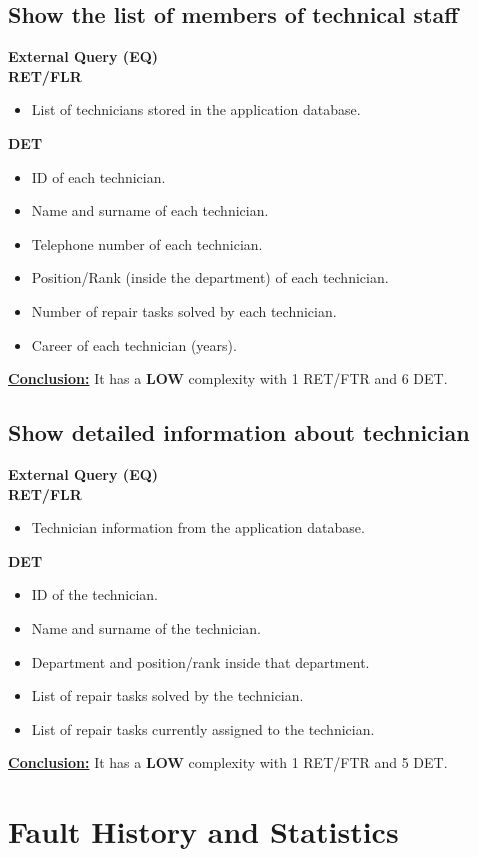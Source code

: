 \subsection{Show the list of members of technical staff}
\textbf{External Query (EQ)} \\ 
\textbf{RET/FLR}
\begin{itemize}
\item List of technicians stored in the application database.
\end{itemize}
\textbf{DET}
\begin{itemize}
\item ID of each technician.
\item Name and surname of each technician.
\item Telephone number of each technician.
\item Position/Rank (inside the department) of each technician.
\item Number of repair tasks solved by each technician.
\item Career of each technician (years). 
\end{itemize}
\textbf{\underline{Conclusion:}} It has a \textbf{LOW} complexity with 1 RET/FTR and 6 DET.

\subsection{Show detailed information about technician}
\textbf{External Query (EQ)} \\ 
\textbf{RET/FLR}
\begin{itemize}
\item Technician information from the application database.
\end{itemize}
\textbf{DET}
\begin{itemize}
\item ID of the technician.
\item Name and surname of the technician.
\item Department and position/rank inside that department.
\item List of repair tasks solved by the technician.
\item List of repair tasks currently assigned to the technician.
\end{itemize}
\textbf{\underline{Conclusion:}} It has a \textbf{LOW} complexity with 1 RET/FTR and 5 DET.



\section{Fault History and Statistics}

